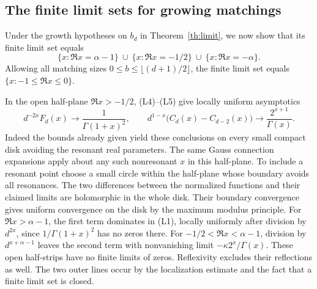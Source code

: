 \documentclass[11pt,a4paper]{article}
\theoremstyle{definition}\newtheorem{problem}[theorem]{Problem}
\begin{document}
\subsection{The finite limit sets for growing matchings}
Under the growth hypotheses on $b_d$ in Theorem~\ref{th:limit}, we now show that its finite limit set equals
\[
 \{x:\Re x=\alpha-1\}\ \cup\ \{x:\Re x=-1/2\}\ \cup\ \{x:\Re x=-\alpha\}.
\]
Allowing all matching sizes $0\le b\le\lfloor(d+1)/2\rfloor$, the finite limit set equals $\{x:-1\le\Re x\le0\}$.

In the open half-plane $\Re x>-1/2$, (L4)--(L5) give locally uniform asymptotics
\[
 d^{-2x}F_d(x)\longrightarrow\frac1{\Gamma(1+x)^2},\qquad
 d^{1-x}\bigl(C_d(x)-C_{d-2}(x)\bigr)\longrightarrow\frac{2^{x+1}}{\Gamma(x)}.
\]
Indeed the bounds already given yield these conclusions on every small compact disk avoiding the resonant real parameters. The same Gauss connection expansions apply about any such nonresonant $x$ in this half-plane. To include a resonant point choose a small circle within the half-plane whose boundary avoids all resonances. The two differences between the normalized functions and their claimed limits are holomorphic in the whole disk. Their boundary convergence gives uniform convergence on the disk by the maximum modulus principle. For $\Re x>\alpha-1$, the first term dominates in (L1), locally uniformly after division by $d^{2x}$, since $1/\Gamma(1+x)^2$ has no zeros there. For $-1/2<\Re x<\alpha-1$, division by $d^{x+\alpha-1}$ leaves the second term with nonvanishing limit $-\kappa 2^x/\Gamma(x)$. These open half-strips have no finite limits of zeros. Reflexivity excludes their reflections as well. The two outer lines occur by the localization estimate and the fact that a finite limit set is closed.
\end{document}
